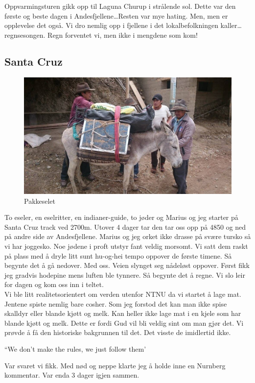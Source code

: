 Oppvarmingsturen gikk opp til Laguna Churup i
strålende sol. Dette var den første og beste dagen i
Andesfjellene\ldots  Resten
var mye hating. Men, men er opplevelse det også. 
Vi dro nemlig opp i fjellene i det lokalbefolkningen kaller\ldots 
regnsesongen. Regn forventet vi, men ikke i mengdene som kom!\\ 



\subsection*{Santa Cruz}

\begin{figure}[!h]
	\centering
	\includegraphics[width=\textwidth]{esel}
	\caption*{Pakkeselet}
\label{fig:pakkesel}
\end{figure}

To eseler, en eselritter, en indianer-guide, to jøder og Marius og jeg
starter på Santa Cruz track ved 2700m. Utover 4 dager tar den tar oss opp på 4850 og
ned på andre side av Andesfjellene. Marius og jeg orket ikke drasse på
svære tursko så vi har joggesko. Noe jødene i proft utstyr fant veldig
morsomt. Vi satt dem raskt på plass med å dryle litt sunt hu-og-hei
tempo oppover de første timene. Så begynte det å gå nedover. Med oss.
Veien slynget seg nådeløst oppover. Først fikk jeg gradvis hodepine
mens luften ble tynnere. Så begynte det å regne. Vi slo leir for
dagen og kom oss inn i teltet.\\

Vi ble litt realitetsorientert om 
verden utenfor NTNU da vi startet å
lage mat. Jentene spiste nemlig bare cosher. Som jeg forstod det kan
man ikke spise skalldyr eller blande kjøtt og melk. Kan heller ikke
lage mat i en kjele som har blande kjøtt og melk. Dette er fordi Gud
vil bli veldig sint om man gjør det. Vi prøvde å få den historiske
bakgrunnen til det. Det visste de imidlertid ikke. 
\begin{dialogue}
	\item ``We don't make the rules, we just follow them'
\end{dialogue}
Var svaret vi fikk. Med nød og neppe klarte jeg å
holde inne en Nurnberg kommentar. Var enda 3 dager igjen sammen.\\

